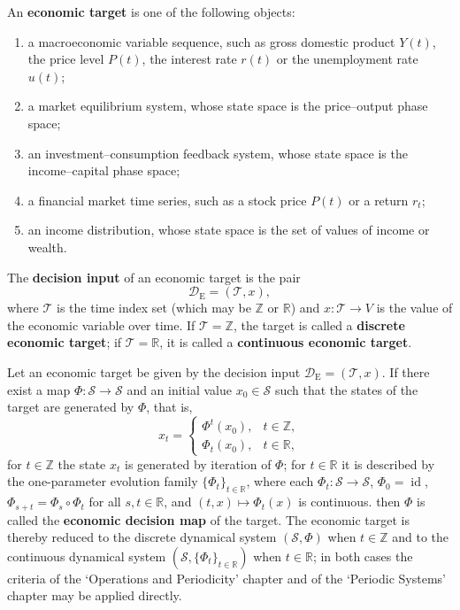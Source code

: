 \begin{definition}\label{def:econ_target}
An \textbf{economic target} is one of the following objects:
\begin{enumerate}[label=(\roman*)]
    \item a macroeconomic variable sequence, such as gross domestic product $Y(t)$, the price level $P(t)$, the interest rate $r(t)$ or the unemployment rate $u(t)$;
    \item a market equilibrium system, whose state space is the price--output phase space;
    \item an investment--consumption feedback system, whose state space is the income--capital phase space;
    \item a financial market time series, such as a stock price $P(t)$ or a return $r_t$;
    \item an income distribution, whose state space is the set of values of income or wealth.
\end{enumerate}
The \textbf{decision input} of an economic target is the pair
\[
\mathcal D_{\mathrm{E}}=(\mathcal T,x),
\]
where $\mathcal T$ is the time index set (which may be $\mathbb Z$ or $\mathbb R$) and $x:\mathcal T\to V$ is the value of the economic variable over time. If $\mathcal T=\mathbb Z$, the target is called a \textbf{discrete economic target}; if $\mathcal T=\mathbb R$, it is called a \textbf{continuous economic target}.
\end{definition}

\begin{definition}\label{def:econ_periodization}
Let an economic target be given by the decision input $\mathcal D_{\mathrm{E}}=(\mathcal T,x)$. If there exist a map $\Phi:\mathcal S\to\mathcal S$ and an initial value $x_0\in\mathcal S$ such that the states of the target are generated by $\Phi$, that is,
\[
x_t=\begin{cases}\Phi^t(x_0), & t\in\mathbb Z,\\ \Phi_t(x_0), & t\in\mathbb R,\end{cases}
\]
for $t\in\mathbb Z$ the state $x_t$ is generated by iteration of $\Phi$; for $t\in\mathbb R$ it is described by the one-parameter evolution family $\{\Phi_t\}_{t\in\mathbb R}$, where each $\Phi_t:\mathcal S\to\mathcal S$, $\Phi_0=\operatorname{id}$, $\Phi_{s+t}=\Phi_s\circ\Phi_t$ for all $s,t\in\mathbb R$, and $(t,x)\mapsto\Phi_t(x)$ is continuous.
then $\Phi$ is called the \textbf{economic decision map} of the target. The economic target is thereby reduced to the discrete dynamical system $(\mathcal S,\Phi)$ when $t\in\mathbb Z$ and to the continuous dynamical system $(\mathcal S,\{\Phi_t\}_{t\in\mathbb R})$ when $t\in\mathbb R$; in both cases the criteria of the `Operations and Periodicity' chapter and of the `Periodic Systems' chapter may be applied directly.
\end{definition}

